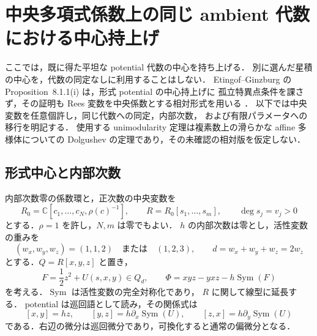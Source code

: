 \section{中央多項式係数上の同じ ambient 代数における中心持上げ}
\label{sec:relative-center-lift}

ここでは，既に得た平坦な potential 代数の中心を持ち上げる．
別に選んだ星積の中心を，代数の同定なしに利用することはしない．
Etingof--Ginzburg の Proposition~8.1.1(i) は，形式 potential の中心持上げに
孤立特異点条件を課さず，その証明も Rees 変数を中央係数とする相対形式を用いる
\cite[\S8.1--8.2]{EG2010}．
以下では中央変数を任意個許し，同じ代数への同定，内部次数，
および有限パラメータへの移行を明記する．
使用する unimodularity 定理は複素数上の滑らかな affine 多様体についての
Dolgushev の定理であり，その未確認の相対版を仮定しない．

\subsection{形式中心と内部次数}

内部次数零の係数環と，正次数の中央変数を
\[
 R_0=\mathbb C[c_1,\ldots,c_N,\rho(c)^{-1}],\qquad
 R=R_0[s_1,\ldots,s_m],\qquad \deg s_j=v_j>0
\]
とする．$\rho=1$ を許し，$N,m$ は零でもよい．
$h$ の内部次数は零とし，活性変数の重みを
\[
 (w_x,w_y,w_z)=(1,1,2)\quad\text{または}\quad(1,2,3),
 \qquad d=w_x+w_y+w_z=2w_z
\]
とする．$Q=R[x,y,z]$ と置き，
\begin{equation}\label{eq:relative-center-classical-potential}
 F=\frac12z^2+U(s,x,y)\in Q_d,\qquad
 \Phi=xyz-yxz-h\operatorname{Sym}(F)
\end{equation}
を考える．$\operatorname{Sym}$ は活性変数の完全対称化であり，
$R$ に関して線型に延長する．
potential は巡回語として読み，その関係式は
\begin{equation}\label{eq:relative-center-potential-relations}
 [x,y]=hz,\qquad
 [y,z]=h\partial_x\operatorname{Sym}(U),\qquad
 [z,x]=h\partial_y\operatorname{Sym}(U)
\end{equation}
である．右辺の微分は巡回微分であり，可換化すると通常の偏微分となる．

